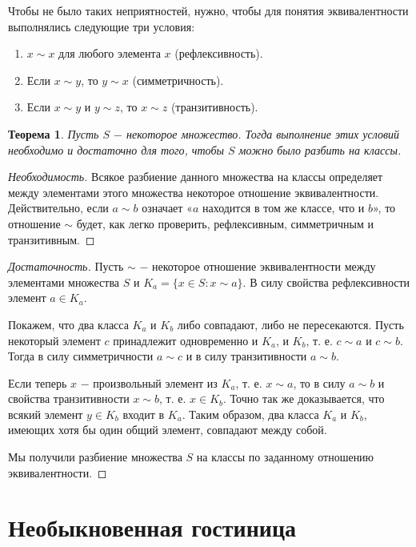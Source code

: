 \documentclass{article}
\newtheorem{theorem}{Теорема}[section]
\begin{document}
Чтобы не было таких неприятностей, нужно, чтобы для понятия эквивалентности выполнялись следующие три условия:

\begin{enumerate}
  \item \(x \sim x\) для любого элемента \(x\) (рефлексивность).
  \item Если \(x \sim y\), то \(y \sim x\) (симметричность).
  \item Если \(x \sim y\) и \(y \sim z\), то \(x \sim z\) (транзитивность).
\end{enumerate}

\begin{theorem}
Пусть \(S\) \(-\) некоторое множество. Тогда выполнение этих условий необходимо и достаточно для того, чтобы \(S\) можно было разбить на классы.
\end{theorem}

\begin{proof}[Необходимость]
Всякое разбиение данного множества на классы определяет между элементами этого множества некоторое отношение эквивалентности. Действительно, если \(a \sim b\) означает «\(a\) находится в том же классе, что и \(b\)», то отношение \(\sim\) будет, как легко проверить, рефлексивным, симметричным и транзитивным.
\end{proof}

\begin{proof}[Достаточность]
Пусть \(\sim\) \(-\) некоторое отношение эквивалентности между элементами множества \(S\) и \(K_a = \{x \in S : x \sim a\}\). В силу свойства рефлексивности элемент \(a \in K_a\).

Покажем, что два класса \(K_a\) и \(K_b\) либо совпадают, либо не пересекаются. Пусть некоторый элемент \(c\) принадлежит одновременно и \(K_a\), и \(K_b\), т. е. \(c \sim a\) и \(c \sim b\). Тогда в силу симметричности \(a \sim c\) и в силу транзитивности \(a \sim b\).

Если теперь \(x\) \(-\) произвольный элемент из \(K_a\), т. е. \(x \sim a\), то в силу \(a \sim b\) и свойства транзитивности \(x \sim b\), т. е. \(x \in K_b\). Точно так же доказывается, что всякий элемент \(y \in K_b\) входит в \(K_a\). Таким образом, два класса \(K_a\) и \(K_b\), имеющих хотя бы один общий элемент, совпадают между собой.

Мы получили разбиение множества \(S\) на классы по заданному отношению эквивалентности.
\end{proof}

\section{Необыкновенная гостиница}
\end{document}
